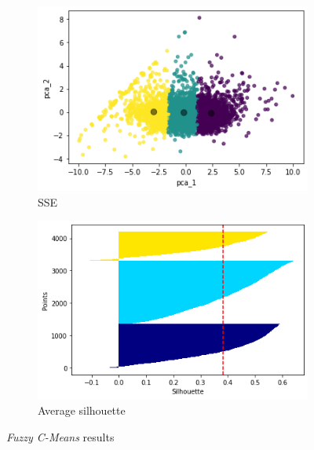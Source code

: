\begin{figure}[h!]
     \captionsetup{justification=centering}		
     \centering
     \begin{subfigure}{0.39\textwidth}
         \centering
	 \captionsetup{type=figure}
         \includegraphics[width=\textwidth]{img/clustering/clust_fcmeans.png}
         \caption{SSE}
         \label{fig:clust_fcmeans}
     \end{subfigure}
     \begin{subfigure}{0.39\textwidth}
         \centering
         \includegraphics[width=\textwidth]{img/clustering/sil_fcmeans.png}
         \caption{Average silhouette}
         \label{fig:sil_fcmeans}
     \end{subfigure}
     \caption{\emph{Fuzzy C-Means} results}
    \label{fig:fc_means_data}
\end{figure}

